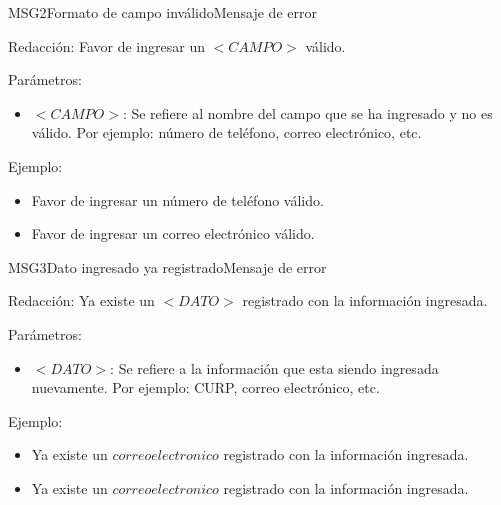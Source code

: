  
\begin{mensaje}{MSG2}{Formato de campo inválido}{Mensaje de error}
	\item[Redacción:] Favor de ingresar un $<CAMPO>$  válido.
    \item[Parámetros:] 
    \begin{itemize}
        
        \item $<CAMPO>$: Se refiere al nombre del campo que se ha ingresado y no es válido. Por ejemplo: número de teléfono, correo electrónico, etc.
    \end{itemize}   

    \item[Ejemplo:]  \begin{itemize}
        \item  Favor de ingresar un número de teléfono  válido.
        \item  Favor de ingresar un correo electrónico válido.
    \end{itemize} 
\end{mensaje}


\begin{mensaje}{MSG3}{Dato ingresado ya registrado}{Mensaje de error}
	\item[Redacción:] Ya existe un $<DATO>$ registrado con la información ingresada.
	
	
	\item[Parámetros:] 
    \begin{itemize}
        \item $<DATO>$: Se refiere a la información que esta siendo ingresada nuevamente. Por ejemplo: CURP, correo electrónico, etc.
    \end{itemize}   

    \item[Ejemplo:]  
    \begin{itemize}
        \item  Ya existe un $correo electronico$ registrado con la información ingresada.
	
        \item  Ya existe un $correo electronico$ registrado con la información ingresada.
	
    \end{itemize} 
\end{mensaje}

